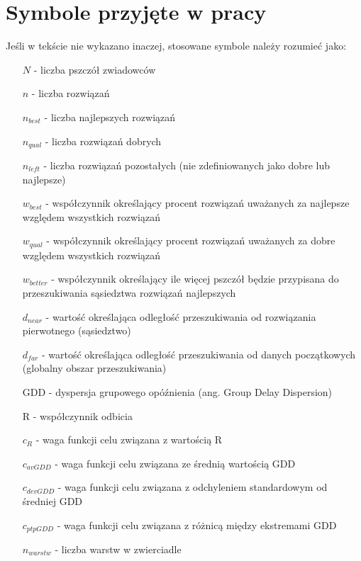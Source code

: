 \chapter*{Symbole przyjęte w pracy}
\label{app:symbole}

Jeśli w tekście nie wykazano inaczej, stosowane symbole należy rozumieć jako:

\begin{itemize}
\item[$N$] - liczba pszczół zwiadowców
\item[$n$] - liczba rozwiązań
\item[$n_{best}$] - liczba najlepszych rozwiązań
\item[$n_{qual}$] - liczba rozwiązań dobrych
\item[$n_{left}$] - liczba rozwiązań pozostałych (nie zdefiniowanych jako dobre lub najlepsze)
\item[$w_{best}$] - współczynnik określający procent rozwiązań uważanych za najlepsze względem wszystkich rozwiązań
\item[$w_{qual}$] - współczynnik określający procent rozwiązań uważanych za dobre względem wszystkich rozwiązań
\item[$w_{better}$] - współczynnik określający ile więcej pszczół będzie przypisana do przeszukiwania sąsiedztwa rozwiązań najlepszych
\item[$d_{near}$] - wartość określająca odległość przeszukiwania od rozwiązania pierwotnego (sąsiedztwo)
\item[$d_{far}$] - wartość określająca odległość przeszukiwania od danych początkowych (globalny obszar przeszukiwania)
\item[GDD] - dyspersja grupowego opóźnienia (ang. Group Delay Dispersion)
\item[R] - współczynnik odbicia
\item[$c_R$] - waga funkcji celu związana z wartością R
\item[$c_{avGDD}$] - waga funkcji celu związana ze średnią wartością GDD
\item[$c_{devGDD}$] - waga funkcji celu związana z odchyleniem standardowym od średniej GDD
\item[$c_{ptpGDD}$] - waga funkcji celu związana z różnicą między ekstremami GDD
\item[$n_{warstw}$] - liczba warstw w zwierciadle
\end{itemize}